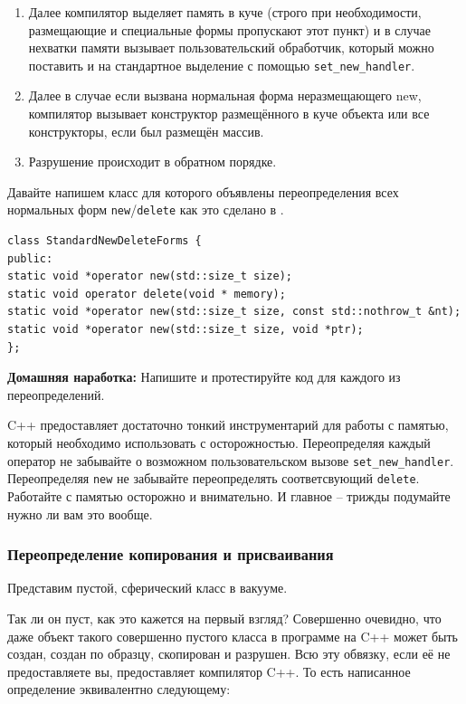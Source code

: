\documentclass[a4paper,12pt,oneside]{article}
\begin{document}
\begin{enumerate}
\item
Далее компилятор выделяет память в куче (строго при необходимости, размещающие и специальные формы пропускают этот пункт) и в случае нехватки памяти вызывает пользовательский обработчик, который можно поставить и на стандартное выделение с помощью \lstinline!set_new_handler!.
\item
Далее в случае если вызвана нормальная форма неразмещающего new, компилятор вызывает конструктор размещённого в куче объекта или все конструкторы, если был размещён массив.
\item
Разрушение происходит в обратном порядке.
\end{enumerate}

Давайте напишем класс для которого объявлены переопределения всех нормальных форм \lstinline!new!/\lstinline!delete! как это сделано в \cite{effcpp3d}.

\begin{lstlisting}
class StandardNewDeleteForms {
public:
static void *operator new(std::size_t size);
static void operator delete(void * memory);
static void *operator new(std::size_t size, const std::nothrow_t &nt);
static void *operator new(std::size_t size, void *ptr);
};
\end{lstlisting}

\textbf{Домашняя наработка:} 
Напишите и протестируйте код для каждого из переопределений.

C++ предоставляет достаточно тонкий инструментарий для работы с памятью, который необходимо использовать с осторожностью. Переопределяя каждый оператор не забывайте о возможном пользовательском вызове \lstinline!set_new_handler!. Переопределяя \lstinline!new! не забывайте переопределять соответсвующий \lstinline!delete!. Работайте с памятью осторожно и внимательно. И главное -- трижды подумайте нужно ли вам это вообще.

\subsubsection{Переопределение копирования и присваивания}

Представим пустой, сферический класс в вакууме.



Так ли он пуст, как это кажется на первый взгляд? Совершенно очевидно, что даже объект такого совершенно пустого класса в программе на C++ может быть создан, создан по образцу, скопирован и разрушен. Всю эту обвязку, если её не предоставляете вы, предоставляет компилятор C++. То есть написанное определение эквивалентно следующему:
\end{document}
